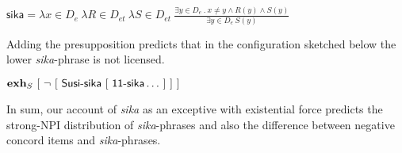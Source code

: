 \documentclass[output=paper]{langscibook}
\def\exh{\ifmmode\mathop{\textbf{exh}}\else\textbf{exh}\xspace\fi}
\begin{document}
\ea \label{syex:sikarev} 
  $\displaystyle \textsf{sika} = \lambda x \in D_e\ \lambda R \in D_{et}\ \lambda S \in D_{et}\ \frac{\exists y \in D_e\ .\ x \neq y \land R(y) \land S(y)}{\exists y \in D_e\ S(y)}$\z

Adding the presupposition predicts that in the configuration sketched below the lower \emph{sika}-phrase is not licensed.

\ea $\exh_S\ [\ \neg\ [\  \textsf{Susi-sika}\  [\ \textsf{11-sika} \dots\ ]\ ]\ ]$ \z

In sum, our account of \emph{sika} as an exceptive with existential force predicts the strong-NPI distribution of \emph{sika}-phrases and also the difference between negative concord items and \emph{sika}-phrases. 














   
\end{document}
